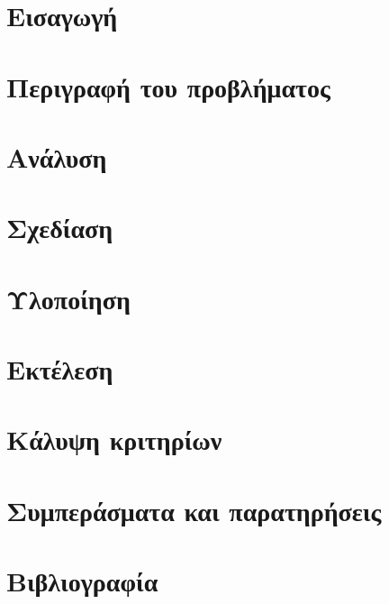 \documentclass[12pt]{article}
\begin{document}
\begin{titlepage}
		
		
		
		
		
		\vfill %
		
	\end{titlepage}
	
	
	
	\tableofcontents
	
	\newpage
	
	 \section{Εισαγωγή}

	
	\newpage
	
	
	
	\section{Περιγραφή του προβλήματος}
	

	
	\section{Ανάλυση}
	
	\section{Σχεδίαση}
	
	\section{Υλοποίηση}
	
	\section{Εκτέλεση}
	
	
	\section{Κάλυψη κριτηρίων}
	
	\section{Συμπεράσματα και παρατηρήσεις}
	
	\section{Βιβλιογραφία}

	
	
	
\end{document}
